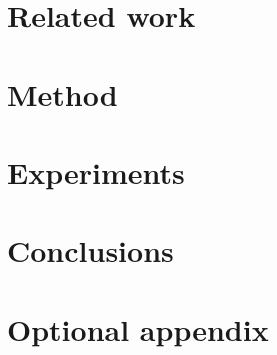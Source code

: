 \documentclass[12pt]{report}
\begin{document}
\chapter{Related work}



\chapter{Method}



\chapter{Experiments}



\chapter{Conclusions}


\appendix
\chapter{Optional appendix}



\end{document}
